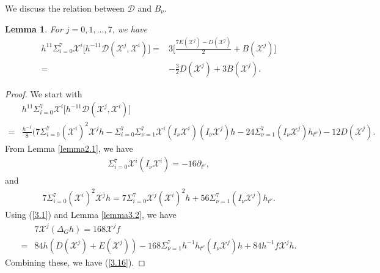 \documentclass[reqno,12pt]{amsart}
\numberwithin{equation}{section}
\theoremstyle{plain}
\newtheorem{lemma}[theorem]{Lemma}
\theoremstyle{definition}
\begin{document}
We discuss the relation between $\mathcal{D}$ and $B_\nu$.
\begin{lemma}\label{lemma3.3} For $j=0,1,...,7$, we have
\begin{equation}\label{3.16}
     \begin{aligned}
h^{11}\Sigma_{i=0}^7\mathscr{X}^i \bigg[h^{-11}\mathcal{D}(\mathscr{X}^j,\mathscr{X}^i)\bigg]=&3\bigg[\frac{7E(\mathscr{X}^j)-D(\mathscr{X}^j)}{2}+B(\mathscr{X}^j)\bigg]\\=&-\frac{3}{2}D(\mathscr{X}^j)+3B(\mathscr{X}^j).
        \end{aligned}\end{equation}
   \end{lemma}
\begin{proof}
We start with
    \begin{align*}
    &h^{11}\Sigma_{i=0}^7\mathscr{X}^i\bigg[h^{-11}\mathcal{D}(\mathscr{X}^j,\mathscr{X}^i)\bigg]\\=&\frac{h^{-1}}{8}\bigg(7\Sigma_{i=0}^7   
    (\mathscr{X}^i)^2\mathscr{X}^jh-        
    \Sigma_{i=0}^7    
    \Sigma_{\nu=1}^7\mathscr{X}^i(I_\nu\mathscr{X}^i)(I_\nu \mathscr{X}^j)h-24\Sigma_{\nu=1}^7(I_\nu \mathscr{X}^j)h_{t^\nu}\bigg)-12D(\mathscr{X}^j).
\end{align*}
From Lemma \ref{lemma2.1}, we have
\begin{align*}
    \Sigma_{i=0}^7\mathscr{X}^i (I_\nu \mathscr{X}^i)=-16\partial_{t^\nu},
\end{align*}
and
\begin{align*}
    7\Sigma_{i=0}^7 (\mathscr{X}^i)^2\mathscr{X}^jh=7\Sigma_{i=0}^7\mathscr{X}^j(\mathscr{X}^i)^2 h+56 \Sigma_{\nu=1}^7(I_\nu \mathscr{X}^j)h_{t^\nu} .
    \end{align*}
    Using (\ref{3.1}) and Lemma \ref{lemma3.2}, we have
    \begin{align*}
       & 7\mathscr{X}^j(\Delta_G h)=168\mathscr{X}^jf\\=&84h(D(\mathscr{X}^j)+E(\mathscr{X}^j))-168\Sigma_{\nu=1}^7h^{-1}h_{t^\nu}(I_\nu \mathscr{X}^j)h+84h^{-1}f\mathscr{X}^jh.
    \end{align*}
  Combining these, we have (\ref{3.16}).  
    \end{proof}









   
  
\end{document}
